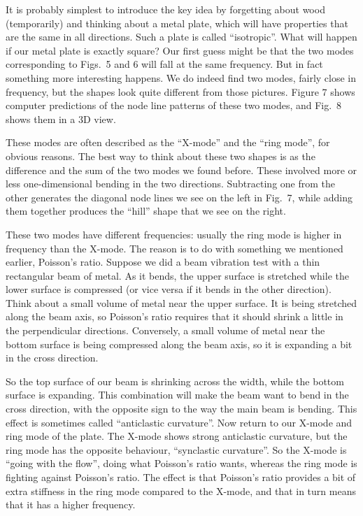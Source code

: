   It is probably simplest to introduce the key idea by forgetting about wood 
  (temporarily) and thinking about a metal plate, which will have properties 
  that are the same in all directions. Such a plate is called “isotropic”. What 
  will happen if our metal plate is exactly square? Our first guess might be 
  that the two modes corresponding to Figs.\ 5 and 6 will fall at the same 
  frequency. But in fact something more interesting happens. We do indeed find 
  two modes, fairly close in frequency, but the shapes look quite different 
  from those pictures. Figure 7 shows computer predictions of the node line 
  patterns of these two modes, and Fig.\ 8 shows them in a 3D view. 

  These modes are often described as the “X-mode” and the “ring mode”, for 
  obvious reasons. The best way to think about these two shapes is as the 
  difference and the sum of the two modes we found before. These involved more 
  or less one-dimensional bending in the two directions. Subtracting one from 
  the other generates the diagonal node lines we see on the left in Fig.\ 7, 
  while adding them together produces the “hill” shape that we see on the 
  right. 

  These two modes have different frequencies: usually the ring mode is higher 
  in frequency than the X-mode. The reason is to do with something we mentioned 
  earlier, Poisson’s ratio. Suppose we did a beam vibration test with a thin 
  rectangular beam of metal. As it bends, the upper surface is stretched while 
  the lower surface is compressed (or vice versa if it bends in the other 
  direction). Think about a small volume of metal near the upper surface. It is 
  being stretched along the beam axis, so Poisson’s ratio requires that it 
  should shrink a little in the perpendicular directions. Conversely, a small 
  volume of metal near the bottom surface is being compressed along the beam 
  axis, so it is expanding a bit in the cross direction. 

  So the top surface of our beam is shrinking across the width, while the 
  bottom surface is expanding. This combination will make the beam want to bend 
  in the cross direction, with the opposite sign to the way the main beam is 
  bending. This effect is sometimes called “anticlastic curvature”. Now return 
  to our X-mode and ring mode of the plate. The X-mode shows strong anticlastic 
  curvature, but the ring mode has the opposite behaviour, “synclastic 
  curvature”. So the X-mode is “going with the flow”, doing what Poisson’s 
  ratio wants, whereas the ring mode is fighting against Poisson’s ratio. The 
  effect is that Poisson’s ratio provides a bit of extra stiffness in the ring 
  mode compared to the X-mode, and that in turn means that it has a higher 
  frequency. 

